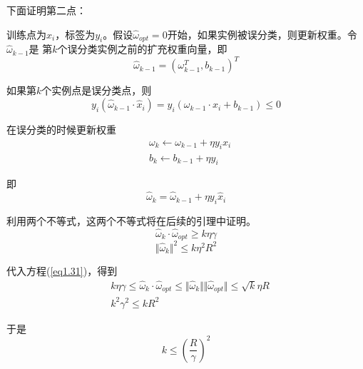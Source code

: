 下面证明第二点：

训练点为$x_i$，标签为$y_i$。假设$\hat{\omega}_{opt}=0$开始，如果实例被误分类，则更新权重。令$\hat{\omega}_{k-1}$是
第$k$个误分类实例之前的扩充权重向量，即
\begin{equation}
    \hat{\omega}_{k-1}=(\omega_{k-1}^T,b_{k-1})^T
\end{equation}

如果第$k$个实例点是误分类点，则
\begin{equation}
    y_i(\hat{\omega}_{k-1}\cdot \hat{x}_i)=y_i(\omega_{k-1}\cdot x_i+b_{k-1})\leqslant 0
\end{equation}

在误分类的时候更新权重
\begin{equation}
    \begin{aligned}
        & \omega_k\leftarrow \omega_{k-1}+\eta y_ix_i\\
        & b_k \leftarrow b_{k-1}+\eta y_i
    \end{aligned}
\end{equation}

即
\begin{equation}
    \hat{\omega}_{k}=\hat{\omega}_{k-1}+\eta y_i\hat{x}_i
    \label{eq1.31}
\end{equation}

利用两个不等式，这两个不等式将在后续的引理中证明。
\begin{equation}
    \hat{\omega}_k\cdot \hat{\omega}_{opt} \geqslant k\eta \gamma
\end{equation}
\begin{equation}
    \Vert \hat{\omega}_k\Vert^2\leqslant k\eta^2R^2
\end{equation}

代入方程(\ref{eq1.31})，得到
\begin{equation}
    \begin{aligned}
        & k\eta \gamma \leqslant \hat{\omega}_k\cdot \hat{\omega}_{opt}\leqslant \Vert\hat{\omega}_k\Vert 
        \Vert\hat{\omega}_{opt}\Vert \leqslant \sqrt{k}\eta R\\
        & k^2\gamma^2\leqslant kR^2
    \end{aligned}
\end{equation}

于是
\begin{equation}
    k\leqslant (\frac{R}{\gamma})^2
\end{equation}









